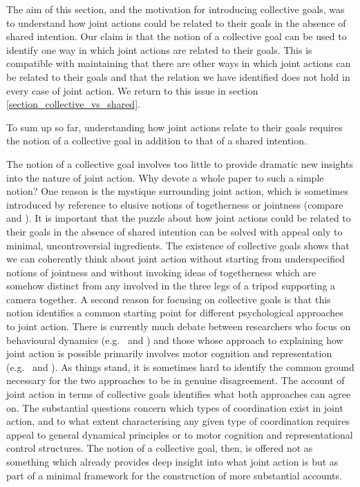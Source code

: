\documentclass[12pt,a4paper]{extarticle}
\begin{document}
The aim of this section, and the motivation for introducing collective goals, was to understand how joint actions could be related to their goals in the absence of shared intention.  
Our claim is that the notion of a collective goal can be used to identify one way in which joint actions are related to their goals.  
This is compatible with maintaining that there are other ways in which joint actions can be related to their goals and that the relation we have identified does not hold in every case of joint action.  
We return to this issue in section \vref{section_collective_vs_shared}.

To sum up so far, understanding how joint actions relate to their goals requires the notion of a collective goal in addition to that of a shared intention.

The notion of a collective goal involves too little to provide dramatic new insights into the nature of joint action.
Why devote a whole paper to such a simple notion?
One reason is the mystique surrounding joint action, which is sometimes introduced by reference to elusive notions of togetherness or jointness (compare 
	\citealp{gilbert_walking_1990} and
	\citealp[p.\ 150]{Bratman:2009lv}%
).
It is important that the puzzle about how joint actions could be related to their goals in the absence of shared intention can be solved with appeal only to minimal, uncontroversial ingredients.
The existence of collective goals shows that we can coherently think about joint action without starting from underspecified notions of jointness and without invoking ideas of togetherness which are somehow distinct from any involved in the three legs of a tripod supporting a camera together.
A second reason for focusing on collective goals 
	is that this notion identifies a common starting point for different psychological approaches to joint action.
There is currently much debate between researchers who focus on behavioural dynamics 
(e.g.\ 
	\citealp{marsh_social_2009} and
	\citealp{schmidt_richardons:_2008}%
)
and those whose approach to explaining how joint action is possible primarily involves motor cognition and representation (e.g.\ 
	\citealp{Sebanz:2005fk} and
	\citealp{Knoblich:2006bn}%
).
As things stand, it is sometimes hard to identify the common ground necessary for the two approaches to be in genuine disagreement.
The account of joint action in terms of collective goals identifies what both approaches can agree on. 
The substantial questions concern which types of coordination exist in joint action, 
	and to what extent characterising any given type of coordination requires appeal to general dynamical principles or to motor cognition and representational control structures.
The notion of a collective goal, then, is offered  not as something which already provides deep insight into what joint action is but as part of a minimal framework for the construction of more substantial accounts.
\end{document}
